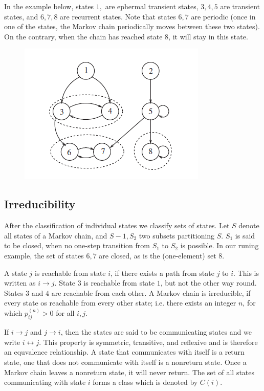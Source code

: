 In the example below, states $1,$ are ephermal transient states, $3,4,5$ are transient states, and $6,7,8$ are recurrent states. Note that states $6,7$ are periodic (once in one of the states, the Markov chain periodically moves between these two states). On the contrary, when the chain has reached state $8$, it will stay in this state.


\begin{figure}[H]
  \includegraphics[scale=1.0]{images/markov_1_2.png}
\end{figure}


\subsection{Irreducibility}

After the classification of individual states we classify sets of states. Let $S$ denote all states of a Markov chain, and $S-1, S_2$ two subsets partitioning $S$. $S_1$ is said to be closed, when no one-step transition from $S_1$ to $S_2$ is possible. In our runing example, the set of states $6,7$ are closed, as is the (one-element) set $8$.

A state $j$ is reachable from state $i$, if there exists a path from state $j$ to $i$. This is written as $i \rightarrow j$. State $3$ is reachable from state $1$, but not the other way round. States $3$ and $4$ are reachable from each other. A Markov chain is irreducible, if every state os reachable from every other state; i.e. there exists an integer $n$, for which $p^{(n)}_{ij} > 0$ for all $i,j$.

If $i \rightarrow j$ and $j \rightarrow i$, then the states are said to be communicating states and we write $i \leftrightarrow j$. This property is symmetric, transitive, and reflexive and is therefore an equvalence relationship. A state that communicates with itself is a return state, one that does not communicate with itself is a nonreturn state. Once a Markov chain leaves a nonreturn state, it will never return. The set of all states communicating with state $i$ forms a class which is denoted by $C(i)$.



